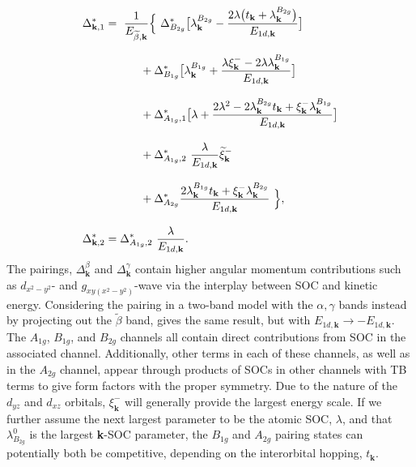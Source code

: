 \documentclass[%
reprint,
superscriptaddress,
 amsmath,amssymb,
 aps,
prb,
nobalancelastpage,
]{revtex4-2}
\begin{document}
\begin{subequations}
\label{full_gap}
    \begin{align}
    &\Delta_{\textbf{k},1}^{*} =~\frac{1}{E_{\widetilde{\beta},\textbf{k}}}\Big\{~ \Delta_{B_{2g}}^{*}\bigl[ \lambda^{B_{2g}}_{\textbf{k}} - \frac{2\lambda\bigl(t_{\textbf{k}} +\lambda^{B_{2g}}_{\textbf{k}}\bigr)}{E_{1d,\textbf{k}}} \bigr] \label{full_gap_1}
     \\[8pt]&\hspace{18mm}\notag+\Delta_{B_{1g}}^{*}\bigl[ \lambda^{B_{1g}}_{\textbf{k}} + \frac{\lambda\xi_{\textbf{k}}^{-} - 2\lambda\lambda^{B_{1g}}_{\textbf{k}}}{E_{1d,\textbf{k}}}\bigr] \\[8pt]&\hspace{18mm}\notag +\Delta_{A_{1g},1}^{*}\bigl[ \lambda + \frac{2\lambda^2 -2\lambda^{B_{2g}}_{\textbf{k}}t_{\textbf{k}} + \xi_{\textbf{k}}^{-}\lambda^{B_{1g}}_{\textbf{k}}}{E_{1d,\textbf{k}}} \bigr] \\[8pt] &\hspace{18mm}\notag + \Delta_{A_{1g},2}^{*}~\frac{\lambda}{E_{1d,\textbf{k}}}\widetilde{\xi}_{\textbf{k}}^{-}\\[8pt] &\hspace{18mm}\notag  +  \Delta_{A_{2g}}^{*}\frac{2\lambda^{B_{1g}}_{\textbf{k}}t_{\textbf{k}} + \xi_{\textbf{k}}^{-}\lambda^{B_{2g}}_{\textbf{k}}}{E_{1d,\textbf{k}}}~\Big\}, \\[8pt]
    &\Delta_{\textbf{k},2}^{*} = \Delta_{A_{1g},2}^{*}~\frac{\lambda}{E_{1d,\textbf{k}}}. \label{full_gap_2}
    \end{align}
\end{subequations}
The pairings, $\Delta_{\textbf{k}}^{\beta}$ and $\Delta_{\textbf{k}}^{\gamma}$ contain higher angular momentum contributions such as $d_{x^2-y^2}$- and $g_{xy(x^2-y^2)}$-wave via the interplay between SOC and kinetic energy. Considering the pairing in a two-band model with the $\alpha,\gamma$ bands instead by projecting out the $\widetilde{\beta}$ band, gives the same result, but with $E_{1d,\textbf{k}}\rightarrow - E_{1d,\textbf{k}}$. The $A_{1g}$, $B_{1g}$, and $B_{2g}$ channels all contain direct contributions from SOC in the associated channel. Additionally, other terms in each of these channels, as well as in the $A_{2g}$ channel, appear through products of SOCs in other channels with TB terms to give form factors with the proper symmetry. Due to the nature of the $d_{yz}$ and $d_{xz}$ orbitals, $\xi_{\textbf{k}}^{-}$ will generally provide the largest energy scale. If we further assume the next largest parameter to be the atomic SOC, $\lambda$, and that $\lambda_{B_{2g}}^{0}$ is the largest \textbf{k}-SOC parameter, the $B_{1g}$ and $A_{2g}$ pairing states can potentially both be competitive, depending on the interorbital hopping, $t_{\textbf{k}}$. 
\end{document}
